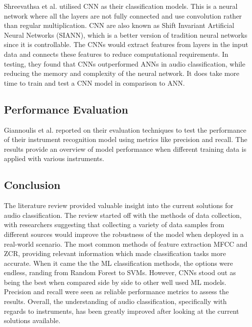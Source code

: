 Shreevathsa et al. utilised CNN as their classification models. This is a neural network where all the layers are not fully connected and use convolution rather than regular multiplication. CNN are also known as Shift Invariant Artificial Neural Networks (SIANN), which is a better version of tradition neural networks since it is controllable. The CNNs would extract features from layers in the input data and connects these features to reduce computational requirements. In testing, they found that CNNs outperformed ANNs in audio classification, while reducing the memory and complexity of the neural network. It does take more time to train and test a CNN model in comparison to ANN. 

\subsection{Performance Evaluation}

Giannoulis et al. reported on their evaluation techniques to test the performance of their instrument recognition model using metrics like precision and recall. The results provide an overview of model performance when different training data is applied with various instruments. 

\subsection{Conclusion}
The literature review provided valuable insight into the current solutions for audio classification. The review started off with the methods of data collection, with researchers suggesting that collecting a variety of data samples from different sources would improve the robustness of the model when deployed in a real-world scenario. The most common methods of feature extraction MFCC and ZCR, providing relevant information which made classification tasks more accurate. When it came the the ML classification methods, the options were endless, randing from Random Forest to SVMs. However, CNNs stood out as being the best when compared side by side to other well used ML models. Precision and recall were seen as reliable performance metrics to assess the results. Overall, the understanding of audio classification, specifically with regards to instruments, has been greatly improved after looking at the current solutions available. 


% 
% 
